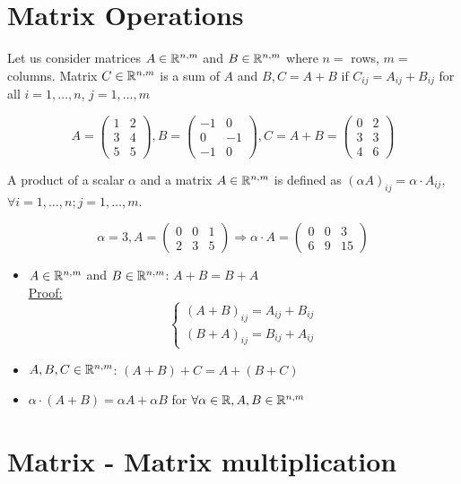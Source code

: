 \section{Matrix Operations}
\begin{definition}
Let us consider matrices $A\in\mathbb{R}^{n,m}$ and $B\in\mathbb{R}^{n,m}$ where $n=$ rows, $m=$ columns. Matrix $C\in\mathbb{R}^{n,m}$ is a sum of $A$ and $B, C=A+B$ if $C_{ij} = A_{ij}+B_{ij}$ for all $i=1,\dots,n$, $j=1,\dots,m$
\end{definition}
\begin{example}
\[
A = \begin{pmatrix}
1 & 2\\
3 & 4\\
5 & 5
\end{pmatrix}, B = \begin{pmatrix}
-1 & 0\\
0 & -1\\
-1 & 0
\end{pmatrix}, C = A+B = \begin{pmatrix}
0 & 2\\
3 & 3\\
4 & 6
\end{pmatrix}
\]	
\end{example}
\begin{definition}
A product of a scalar $\alpha$ and a matrix $A\in\mathbb{R}^{n,m}$ is defined as $\left( \alpha A\right)_{ij} = \alpha\cdot A_{ij}$, $\forall i=1,\dots,n; j=1,\dots,m$.
\end{definition}
\begin{example}
\[\alpha = 3,A = \begin{pmatrix}
0 & 0 & 1\\
2 & 3 & 5	
\end{pmatrix}\Rightarrow \alpha\cdot A = \begin{pmatrix}
0 & 0 & 3\\
6 & 9 & 15
\end{pmatrix}
\]	
\end{example}
\begin{properties}
\begin{itemize}
\item $A\in\mathbb{R}^{n,m}$ and $B\in\mathbb{R}^{n,m}$: $A+B = B+A$\\
\ul{Proof:} 
\[
\begin{cases}
\left( A+B \right)_{ij} = A_{ij}+B_{ij}\\
\left( B+A \right)_{ij} = B_{ij}+A_{ij}
\end{cases}
\]
\item $A,B,C\in\mathbb{R}^{n,m}$: $(A+B)+C = A+(B+C)$
\item $\alpha\cdot (A+B) = \alpha A+\alpha B$ for $\forall \alpha\in\mathbb{R}, A,B\in\mathbb{R}^{n,m}$
\end{itemize}
	
\end{properties}

\section{Matrix - Matrix multiplication}
